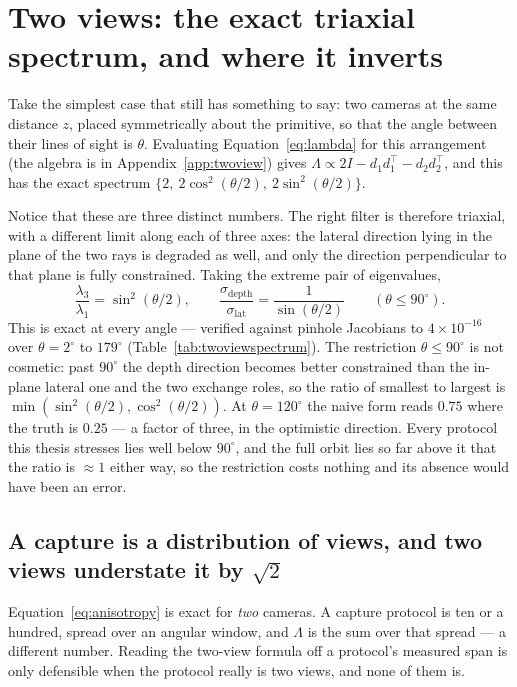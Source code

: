 \section{Two views: the exact triaxial spectrum, and where it inverts}
\label{sec:anisotropy}
Take the simplest case that still has something to say: two cameras at the same
distance $z$, placed symmetrically about the primitive, so that the angle
between their lines of sight is $\theta$. Evaluating
Equation~\eqref{eq:lambda} for this arrangement (the algebra is in
Appendix~\ref{app:twoview}) gives $\Lambda \propto 2I - d_1d_1^{\!\top} -
d_2d_2^{\!\top}$, and this has the exact spectrum
$\{2,\ 2\cos^2(\theta/2),\ 2\sin^2(\theta/2)\}$.

Notice that these are three distinct numbers. The right filter is therefore triaxial, with a different limit along each of
three axes: the lateral
direction lying in the plane of the two rays is degraded as well, and only the
direction perpendicular to that plane is fully constrained. Taking the extreme
pair of eigenvalues,
\begin{equation}
  \frac{\lambda_3}{\lambda_1} = \sin^2(\theta/2),
  \qquad
  \frac{\sigma_{\mathrm{depth}}}{\sigma_{\mathrm{lat}}} = \frac{1}{\sin(\theta/2)}
  \qquad (\theta \le 90^\circ).
  \label{eq:anisotropy}
\end{equation}
This is exact at every angle --- verified against pinhole Jacobians to
$4\times10^{-16}$ over $\theta = 2^\circ$ to $179^\circ$
(Table~\ref{tab:twoviewspectrum}). The restriction $\theta \le 90^\circ$ is not
cosmetic: past $90^\circ$ the depth direction becomes better constrained than the
in-plane lateral one and the two exchange roles, so the ratio of smallest to
largest is $\min(\sin^2(\theta/2), \cos^2(\theta/2))$. At $\theta = 120^\circ$
the naive form reads $0.75$ where the truth is $0.25$ --- a factor of three, in
the optimistic direction. Every protocol this thesis stresses lies well below
$90^\circ$, and the full orbit lies so far above it that the ratio is $\approx 1$
either way, so the restriction costs nothing and its absence would have been an
error.

\subsection{A capture is a distribution of views, and two views understate it by $\sqrt{2}$}
\label{sec:capprediction}

Equation~\eqref{eq:anisotropy} is exact for \emph{two} cameras. A capture
protocol is ten or a hundred, spread over an angular window, and $\Lambda$ is the
sum over that spread --- a different number. Reading the two-view formula off a
protocol's measured span is only defensible when the protocol really is two
views, and none of them is.

